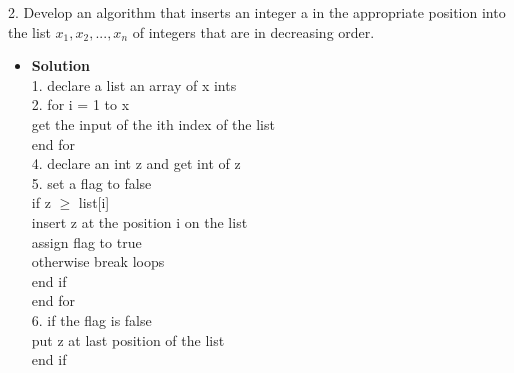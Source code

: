\documentclass[11pt]{article}
\begin{document}


\begin{enumerate}

\begin{flushleft}
{\large 2. Develop an algorithm that inserts an integer a in the appropriate position into the list $x_1, x_2, ..., x_n$ of
integers that are in decreasing order.}\\
\end{flushleft}





\begin{itemize}

\item \textbf{Solution}\\
\large 1. declare a list an array of x ints\\
\large 2. for i = 1 to x\\
\large \hspace*{10mm} get the input of the ith index of the list\\
\large \hspace*{5mm} end for\\
\large 4. declare an int z and get int of z\\
\large 5. set a flag to false\\
\large \hspace*{10mm} if z $\geq$ list[i] \\
\large \hspace*{15mm} insert z at the position i on the list\\
\large \hspace*{15mm} assign flag to true \\
\large \hspace*{15mm} otherwise break loops\\
\large \hspace*{10mm} end if \\
\large \hspace*{5mm} end for\\ 
\large 6. if the flag is false \\
\large \hspace*{10mm} put z at last position of the list \\
\large \hspace*{5mm} end if\\

\end {itemize}
\end {enumerate}
\end{document}
